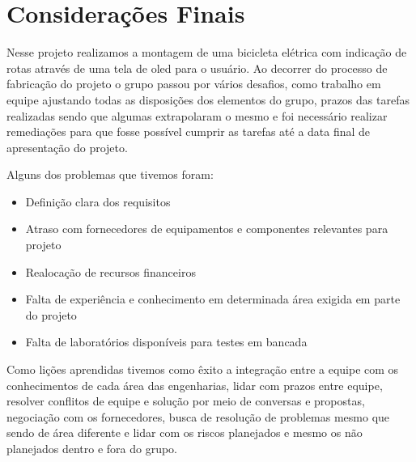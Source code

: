 \chapter{Considerações Finais}

Nesse projeto realizamos a montagem de uma bicicleta elétrica com indicação de rotas através de uma tela de oled para o usuário. Ao decorrer do processo de fabricação do projeto o grupo passou por vários desafios, como trabalho em equipe ajustando todas as disposições dos elementos do grupo, prazos das tarefas realizadas sendo que algumas extrapolaram o mesmo e foi necessário realizar remediações para que fosse possível cumprir as tarefas até a data final de apresentação do projeto. 

Alguns dos problemas que tivemos foram:

\begin{itemize}
	\item Definição clara dos requisitos
	\item Atraso com fornecedores de equipamentos e componentes relevantes para projeto
	\item Realocação de recursos financeiros
	\item Falta de experiência e conhecimento em determinada área exigida em parte do projeto
	\item Falta de laboratórios disponíveis para testes em bancada
\end{itemize}

Como lições aprendidas tivemos como êxito a integração entre a equipe com os conhecimentos de cada área das engenharias, lidar com prazos entre equipe, resolver conflitos de equipe e solução por meio de conversas e propostas, negociação com os fornecedores, busca de resolução de problemas mesmo que sendo de área diferente e lidar com os riscos planejados e mesmo os não planejados dentro e fora do grupo.